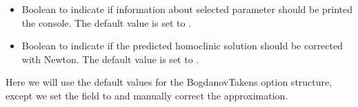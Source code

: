 \documentclass[letterpaper,10pt,english]{jupyterBook}
\begin{document}
\begin{itemize}
\begin{itemize}
\item {} 
\sphinxAtStartPar
orbitalv2,

\item {} 
\sphinxAtStartPar
LP (Lindstedt\sphinxhyphen{}Poincaré with smooth normal form),

\item {} 
\sphinxAtStartPar
LPHypernormalForm,

\item {} 
\sphinxAtStartPar
RegularPerturbation,

\item {} 
\sphinxAtStartPar
RegularPerturbationL2.

\end{itemize}

\sphinxAtStartPar
We refer to {[}\hyperlink{cite.references:id3}{Kuz21}{]} for the interpretations.

\item {} 
\sphinxAtStartPar
{} Boolean to indicate if information about selected parameter should
be printed the console. The default value is set to .

\item {} 
\sphinxAtStartPar
{} Boolean to indicate if the predicted homoclinic solution should be
corrected with Newton. The default value is set to .

\end{itemize}

\sphinxAtStartPar
Here we will use the default values for the Bogdanov\sphinxhyphen{}Takens option structure,
except we set the field  to  and manually correct the
approximation.
\end{document}
